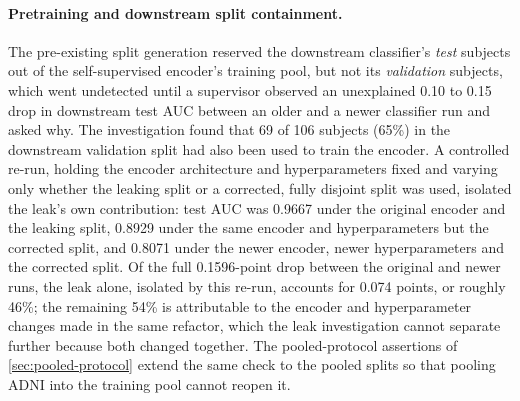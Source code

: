 \paragraph{Pretraining and downstream split containment.} The pre-existing split generation reserved the
downstream classifier's \emph{test} subjects out of the self-supervised encoder's training
pool, but not its \emph{validation} subjects, which went undetected until a supervisor
observed an unexplained 0.10 to 0.15 drop in downstream test \ac{AUC} between an older and
a newer classifier run and asked why. The investigation found that 69 of 106 subjects
(65\%) in the downstream validation split had also been used to train the encoder. A
controlled re-run, holding the encoder architecture and hyperparameters fixed and varying
only whether the leaking split or a corrected, fully disjoint split was used, isolated the
leak's own contribution: test \ac{AUC} was 0.9667 under the original encoder and the
leaking split, 0.8929 under the same encoder and hyperparameters but the corrected split,
and 0.8071 under the newer encoder, newer hyperparameters and the corrected split. Of the
full 0.1596-point drop between the original and newer runs, the leak alone, isolated by
this re-run, accounts for 0.074 points, or roughly 46\%; the remaining 54\% is attributable
to the encoder and hyperparameter changes made in the same refactor, which the leak
investigation cannot separate further because both changed together. The
pooled-protocol assertions of \autoref{sec:pooled-protocol} extend the same check to the
pooled splits so that pooling \ac{ADNI} into the training pool cannot reopen it.
